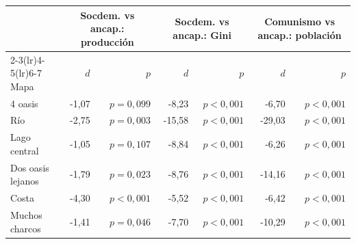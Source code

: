 \begin{tabular}{lrrrrrr}
\toprule
 & \multicolumn{2}{c}{Socdem. vs ancap.: producción} & \multicolumn{2}{c}{Socdem. vs ancap.: Gini} & \multicolumn{2}{c}{Comunismo vs ancap.: población} \\
\cmidrule(lr){2-3}\cmidrule(lr){4-5}\cmidrule(lr){6-7}
Mapa & $d$ & $p$ & $d$ & $p$ & $d$ & $p$ \\
\midrule
4 oasis & -1,07 & $p=0{,}099$ & -8,23 & $p<0{,}001$ & -6,70 & $p<0{,}001$ \\
Río & -2,75 & $p=0{,}003$ & -15,58 & $p<0{,}001$ & -29,03 & $p<0{,}001$ \\
Lago central & -1,05 & $p=0{,}107$ & -8,84 & $p<0{,}001$ & -6,26 & $p<0{,}001$ \\
Dos oasis lejanos & -1,79 & $p=0{,}023$ & -8,76 & $p<0{,}001$ & -14,16 & $p<0{,}001$ \\
Costa & -4,30 & $p<0{,}001$ & -5,52 & $p<0{,}001$ & -6,42 & $p<0{,}001$ \\
Muchos charcos & -1,41 & $p=0{,}046$ & -7,70 & $p<0{,}001$ & -10,29 & $p<0{,}001$ \\
\bottomrule
\end{tabular}
